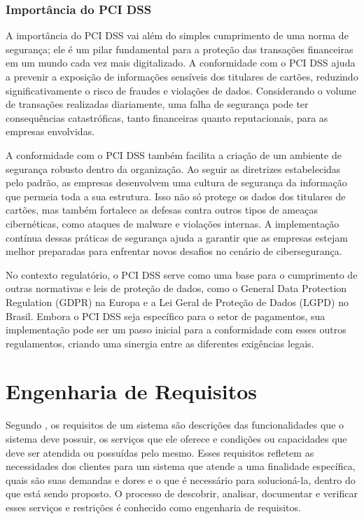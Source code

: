     \subsubsection{Importância do PCI DSS}
    A importância do PCI DSS vai além do simples cumprimento de uma norma de segurança; ele é um pilar fundamental para a proteção das transações financeiras em um mundo cada vez mais digitalizado. A conformidade com o PCI DSS ajuda a prevenir a exposição de informações sensíveis dos titulares de cartões, reduzindo significativamente o risco de fraudes e violações de dados. Considerando o volume de transações realizadas diariamente, uma falha de segurança pode ter consequências catastróficas, tanto financeiras quanto reputacionais, para as empresas envolvidas.

    A conformidade com o PCI DSS também facilita a criação de um ambiente de segurança robusto dentro da organização. Ao seguir as diretrizes estabelecidas pelo padrão, as empresas desenvolvem uma cultura de segurança da informação que permeia toda a sua estrutura. Isso não só protege os dados dos titulares de cartões, mas também fortalece as defesas contra outros tipos de ameaças cibernéticas, como ataques de malware e violações internas. A implementação contínua dessas práticas de segurança ajuda a garantir que as empresas estejam melhor preparadas para enfrentar novos desafios no cenário de cibersegurança.

    No contexto regulatório, o PCI DSS serve como uma base para o cumprimento de outras normativas e leis de proteção de dados, como o General Data Protection Regulation (GDPR) na Europa e a Lei Geral de Proteção de Dados (LGPD) no Brasil. Embora o PCI DSS seja específico para o setor de pagamentos, sua implementação pode ser um passo inicial para a conformidade com esses outros regulamentos, criando uma sinergia entre as diferentes exigências legais.
    
    \section{Engenharia de Requisitos}
    Segundo , os requisitos de um sistema são descrições das funcionalidades que o sistema deve possuir, os serviços que ele oferece e condições ou capacidades que deve ser atendida ou possuídas pelo mesmo. Esses requisitos refletem as necessidades dos clientes para um sistema que atende a uma finalidade específica,  quais são suas demandas e dores e o que é necessário para solucioná-la, dentro do que está sendo proposto. O processo de descobrir, analisar, documentar e verificar esses serviços e restrições é conhecido como engenharia de requisitos. 
    
